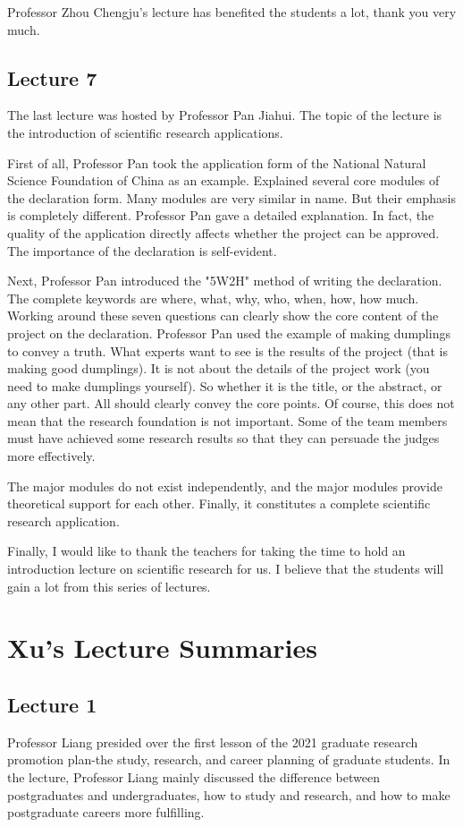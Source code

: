 \documentclass[UTF-8]{ctexart}
\begin{document}
Professor Zhou Chengju’s lecture has benefited the students a lot, thank you very much. 

\subsection{Lecture 7}
The last lecture was hosted by Professor Pan Jiahui. The topic of the lecture is the introduction of scientific research applications.

First of all, Professor Pan took the application form of the National Natural Science Foundation of China as an example. Explained several core modules of the declaration form. Many modules are very similar in name. But their emphasis is completely different. Professor Pan gave a detailed explanation. In fact, the quality of the application directly affects whether the project can be approved. The importance of the declaration is self-evident.


Next, Professor Pan introduced the "5W2H" method of writing the declaration. The complete keywords are where, what, why, who, when, how, how much. Working around these seven questions can clearly show the core content of the project on the declaration. Professor Pan used the example of making dumplings to convey a truth. What experts want to see is the results of the project (that is making good dumplings). It is not about the details of the project work (you need to make dumplings yourself). So whether it is the title, or the abstract, or any other part. All should clearly convey the core points. Of course, this does not mean that the research foundation is not important. Some of the team members must have achieved some research results so that they can persuade the judges more effectively.

The major modules do not exist independently, and the major modules provide theoretical support for each other. Finally, it constitutes a complete scientific research application. 

Finally, I would like to thank the teachers for taking the time to hold an introduction lecture on scientific research for us. I believe that the students will gain a lot from this series of lectures. 


\section{Xu's Lecture Summaries}

\subsection{Lecture 1}
Professor Liang presided over the first lesson of the 2021 graduate research promotion plan-the study, research, and career planning of graduate students. In the lecture, Professor Liang mainly discussed the difference between postgraduates and undergraduates, how to study and research, and how to make postgraduate careers more fulfilling.
\end{document}
